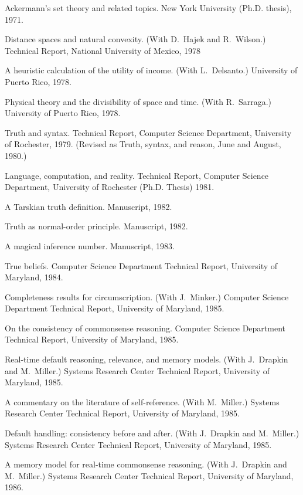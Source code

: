 {\paper
Ackermann's set theory and related topics.
New York University (Ph.D. thesis), 1971.

\paper
Distance  spaces  and natural convexity.
(With D.~Hajek and R.~Wilson.)
Technical Report, National University of Mexico, 1978

\paper
A heuristic calculation of the utility of income.
(With L.~Delsanto.)
University of Puerto Rico, 1978.

\paper
Physical theory and the divisibility of space and time.
(With R.~Sarraga.)
University of Puerto Rico, 1978.

\paper
Truth and syntax.
Technical Report, Computer Science Department,
University of Rochester, 1979. (Revised as Truth, syntax, and reason,
June and August, 1980.)

\paper
Language, computation, and reality.
Technical Report, Computer Science
Department, University of Rochester (Ph.D. Thesis) 1981.

\paper
A Tarskian truth definition.
Manuscript, 1982.

\paper
Truth as normal-order principle.
Manuscript, 1982.

\paper
A magical inference number.
Manuscript, 1983.

\paper
True beliefs.
Computer Science Department Technical Report, University of Maryland, 1984.

\paper
Completeness results for circumscription.
(With J.~Minker.)
Computer Science Department Technical Report, University of Maryland, 1985.

\paper
On the consistency of commonsense reasoning.
Computer Science Department Technical Report,
University of Maryland, 1985.

\paper
Real-time default reasoning, relevance, and memory models.
(With J.~Drapkin and M.~Miller.)
Systems Research Center Technical Report,
University of Maryland, 1985.

\paper
A commentary on the literature of self-reference.
(With M.~Miller.)
Systems Research Center Technical Report,
University of Maryland, 1985.

\paper
Default handling: consistency before and after.
(With J.~Drapkin and M.~Miller.)
Systems Research Center Technical Report,
University of Maryland, 1985.

\paper
A memory model for real-time commonsense reasoning.
(With J.~Drapkin and M.~Miller.)
Systems Research Center Technical Report,
University of Maryland, 1986.

}
